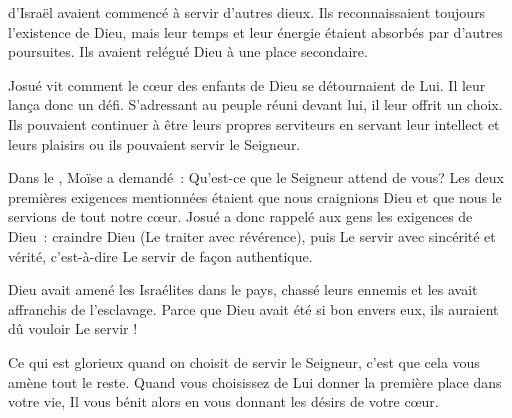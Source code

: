 \dvrule






 d'Israël avaient commencé à servir d'autres dieux.
 Ils reconnaissaient toujours l'existence de Dieu, mais leur temps
 et leur énergie étaient absorbés par d'autres poursuites.
 Ils avaient relégué Dieu à une place secondaire.

Josué vit comment le cœur des enfants de Dieu se détournaient de Lui.
 Il leur lança donc un défi. S'adressant au peuple réuni devant lui,
 il leur offrit un choix. Ils pouvaient continuer à être
 leurs propres serviteurs
 \ocadr en servant leur intellect et leurs plaisirs \fcadr{}
 ou ils pouvaient servir le Seigneur.


Dans le , Moïse a demandé~:
 \og Qu'est-ce que le Seigneur attend de vous? \fg{}
 Les deux premières exigences mentionnées
 étaient que nous craignions Dieu et que nous le servions de tout notre cœur.
 Josué a donc rappelé aux gens les exigences de Dieu~:
 craindre Dieu (Le traiter avec révérence),
 puis Le servir avec sincérité et vérité,
 c'est-à-dire Le servir de façon authentique.

Dieu avait amené les Israélites dans le pays,
 chassé leurs ennemis et les avait affranchis de l'esclavage.
 Parce que Dieu avait été si bon envers eux, ils auraient dû vouloir Le servir !

Ce qui est glorieux quand on choisit de servir le Seigneur,
 c'est que cela vous amène tout le reste.
 Quand vous choisissez de Lui donner la première place dans votre vie,
 Il vous bénit alors en vous donnant les désirs de votre cœur. 

\dvrule


